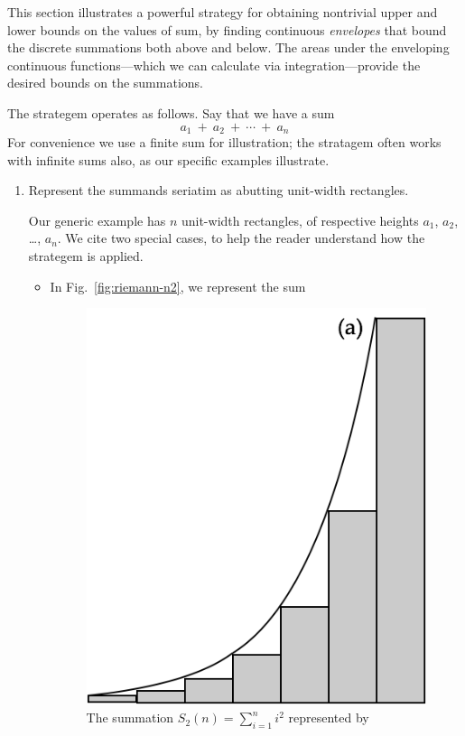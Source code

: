 This section illustrates a powerful strategy for obtaining nontrivial
upper and lower bounds on the values of sum, by finding continuous {\em
  envelopes} that bound the discrete summations both above and below.
The areas under the enveloping continuous functions---which we can
calculate via integration---provide the desired bounds on the
summations.

The strategem operates as follows.  Say that we have a sum
\[ a_1 \ + \ a_2 \ + \ \cdots \ + \ a_n \]
For convenience we use a finite sum for illustration; the stratagem
often works with infinite sums also, as our specific examples
illustrate.
\begin{enumerate}
\item
Represent the summands seriatim as abutting unit-width rectangles.  

Our generic example has $n$ unit-width rectangles, of respective
heights $a_1$, $a_2$, \ldots, $a_n$.  We cite two special cases, to
help the reader understand how the strategem is applied.
  \begin{itemize}
  \item
In Fig.~\ref{fig:riemann-n2}, we represent the sum
\begin{figure}[htb]
\centerline{
\includegraphics[scale=0.3]{FiguresMaths/SumSquaresContinuous1}
}
\caption{The summation $S_2(n) = \sum_{i=1}^n  i^2$ represented by
}
\end{figure}
\end{itemize}
\end{enumerate}
